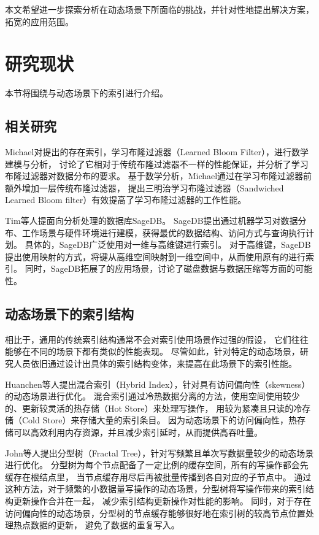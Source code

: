 本文希望进一步探索分析{\li}在动态场景下所面临的挑战，并针对性地提出解决方案，拓宽{\li}的应用范围。

\section{研究现状}

本节将围绕{\li}与动态场景下的索引进行介绍。

\subsection{{\li}相关研究}

Michael\cite{NIPS2018_7328}对提出的存在索引\cite{kraska2018case}，学习布隆过滤器（Learned Bloom Filter），进行数学建模与分析，
讨论了它相对于传统布隆过滤器不一样的性能保证，并分析了学习布隆过滤器对数据分布的要求。
基于数学分析，Michael通过在学习布隆过滤器前额外增加一层传统布隆过滤器，
提出三明治学习布隆过滤器（Sandwiched Learned Bloom ﬁlter）有效提高了学习布隆过滤器的工作性能。

Tim等人提面向分析处理的数据库SageDB\cite{kraska2019sagedb}。
SageDB提出通过机器学习对数据分布、工作场景与硬件环境进行建模，获得最优的数据结构、访问方式与查询执行计划。
具体的，SageDB广泛使用{\li}对一维与高维键进行索引。
对于高维键，SageDB提出使用映射的方式，将键从高维空间映射到一维空间中，从而使用原有的{\li}进行索引。
同时，SageDB拓展了{\li}的应用场景，讨论了磁盘数据与数据压缩等方面的可能性。

\subsection{动态场景下的索引结构}

相比于{\li}，通用的传统索引结构通常不会对索引使用场景作过强的假设，
它们往往能够在不同的场景下都有类似的性能表现。
尽管如此，针对特定的动态场景，研究人员依旧通过设计出具体的索引结构变体，来提高在此场景下的索引性能。

Huanchen等人提出混合索引\cite{zhang2016reducing}（Hybrid Index），针对具有访问偏向性（skewness）的动态场景进行优化。
混合索引通过冷热数据分离的方法，使用空间使用较少的、更新较灵活的热存储（Hot Store）来处理写操作，
用较为紧凑且只读的冷存储（Cold Store）来存储大量的索引条目。
因为动态场景下的访问偏向性，热存储可以高效利用内存资源，并且减少索引延时，从而提供高吞吐量。

John等人提出分型树\cite{esmet2012tokufs}（Fractal Tree），针对写频繁且单次写数据量较少的动态场景进行优化。
分型树为每个节点配备了一定比例的缓存空间，所有的写操作都会先缓存在根结点里，
当节点缓存用尽后再被批量传播到各自对应的子节点中。
通过这种方法，对于频繁的小数据量写操作的动态场景，分型树将写操作带来的索引结构更新操作合并在一起，
减少索引结构更新操作对性能的影响。
同时，对于存在访问偏向性的动态场景，分型树的节点缓存能够很好地在索引树的较高节点位置处理热点数据的更新，
避免了数据的重复写入。

